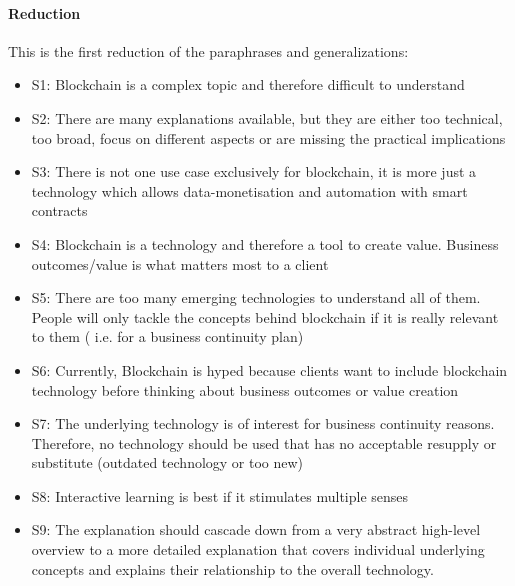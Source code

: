 \paragraph{Reduction} This is the first reduction of the paraphrases and generalizations: 
\begin{itemize}
    \item S1: Blockchain is a complex topic and therefore difficult to understand 
    \item S2: There are many explanations available, but they are either too technical, too broad, focus on different aspects or are missing the practical implications
    \item S3: There is not one use case exclusively for blockchain, it is more just a technology which allows data-monetisation and automation with smart contracts
    \item S4: Blockchain is a technology and therefore a tool to create value. Business outcomes/value is what matters most to a client
    \item S5: There are too many emerging technologies to understand all of them. People will only tackle the concepts behind blockchain if it is really relevant to them ( i.e. for a business continuity plan)
    \item S6: Currently, Blockchain is hyped because clients want to include blockchain technology before thinking about business outcomes or value creation 
    \item S7: The underlying technology is of interest for business continuity reasons. Therefore, no technology should be used that has no acceptable resupply or substitute (outdated technology or too new)
    \item S8: Interactive learning is best if it stimulates multiple senses
    \item S9: The explanation should cascade down from a very abstract high-level overview to a more detailed explanation that covers individual underlying concepts and explains their relationship to the overall technology.
\end{itemize}



